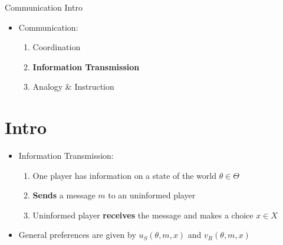 \documentclass{beamer}
\begin{document}
\begin{frame}{Communication Intro}
	\begin{itemize}
		\item Communication:
		\begin{enumerate}
			\item Coordination
			\item \textbf{Information Transmission}
			\item Analogy \& Instruction
		\end{enumerate}
	\end{itemize}
\end{frame}
\section{Intro}
\begin{frame}{ }
	\begin{itemize}
		\item Information Transmission:
			\begin{enumerate}
				\item One player has information on a state of the world $\theta\in\Theta$
				\item \textbf{Sends} a message $m$ to an uninformed player
				\item Uninformed player \textbf{receives} the message and makes a choice $x\in X$
			\end{enumerate}

		\item General preferences are given by $u_S(\theta,m,x)$ and $v_R(\theta,m,x)$
	\end{itemize}
\end{frame}
\end{document}
